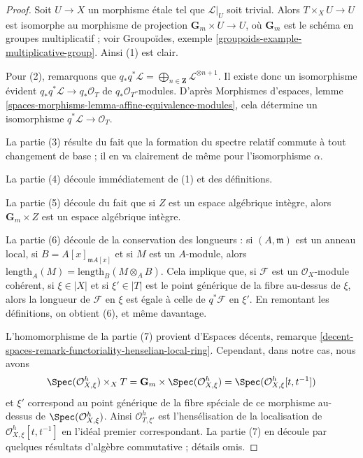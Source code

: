 \begin{proof}
Soit $U \to X$ un morphisme \'etale tel que $\mathcal{L}|_U$ soit trivial.
Alors $T \times_X U \to U$ est isomorphe au morphisme de projection
$\mathbf{G}_m \times U \to U$, où $\mathbf{G}_m$ est le schéma en groupes
multiplicatif ; voir Groupoïdes, exemple
\ref{groupoids-example-multiplicative-group}. Ainsi (1) est clair.

\medskip\noindent
Pour (2), remarquons que $q_*q^*\mathcal{L} = \bigoplus_{n \in \mathbf{Z}}
\mathcal{L}^{\otimes n + 1}$. Il existe donc un isomorphisme évident
$q_*q^*\mathcal{L} \to q_*\mathcal{O}_T$ de $q_*\mathcal{O}_T$-modules. D'après
Morphismes d'espaces, lemme
\ref{spaces-morphisms-lemma-affine-equivalence-modules}, cela détermine un
isomorphisme $q^*\mathcal{L} \to \mathcal{O}_T$.

\medskip\noindent
La partie (3) résulte du fait que la formation du spectre relatif commute à
tout changement de base ; il en va clairement de même pour
l'isomorphisme $\alpha$.

\medskip\noindent
La partie (4) découle immédiatement de (1) et des définitions.

\medskip\noindent
La partie (5) découle du fait que si $Z$ est un espace algébrique intègre,
alors $\mathbf{G}_m \times Z$ est un espace algébrique intègre.

\medskip\noindent
La partie (6) découle de la conservation des longueurs : si $(A,
\mathfrak m)$ est un anneau local, si $B = A[x]_{\mathfrak m A[x]}$ et si $M$
est un $A$-module, alors $\text{length}_A(M) = \text{length}_B(M \otimes_A
B)$. Cela implique que, si $\mathcal{F}$ est un $\mathcal{O}_X$-module cohérent,
si $\xi \in |X|$ et si $\xi' \in |T|$ est le point générique de la fibre
au-dessus de $\xi$, alors la longueur de $\mathcal{F}$ en $\xi$ est égale à celle de
$q^*\mathcal{F}$ en $\xi'$. En remontant les définitions, on obtient (6), et
même davantage.

\medskip\noindent
L'homomorphisme de la partie (7) provient d'Espaces décents, remarque
\ref{decent-spaces-remark-functoriality-henselian-local-ring}. Cependant, dans
notre cas, nous avons
$$
\Spec(\mathcal{O}_{X, \xi}^h) \times_X T =
\mathbf{G}_m \times \Spec(\mathcal{O}_{X, \xi}^h) =
\Spec(\mathcal{O}_{X, \xi}^h[t, t^{-1}])
$$
et $\xi'$ correspond au point générique de la fibre spéciale de ce morphisme au-dessus de
$\Spec(\mathcal{O}_{X, \xi}^h)$. Ainsi $\mathcal{O}_{T, \xi'}^h$ est
l'hensélisation de la localisation de $\mathcal{O}_{X, \xi}^h[t, t^{-1}]$ en
l'idéal premier correspondant. La partie (7) en découle par quelques résultats
d'algèbre commutative ; détails omis.
\end{proof}

